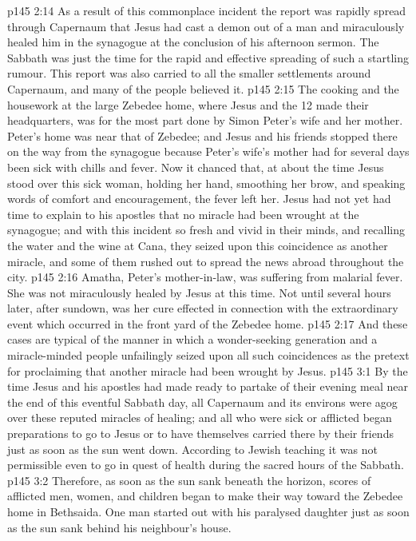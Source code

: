 \vs p145 2:14 As a result of this commonplace incident the report was rapidly spread through Capernaum that Jesus had cast a demon out of a man and miraculously healed him in the synagogue at the conclusion of his afternoon sermon. The Sabbath was just the time for the rapid and effective spreading of such a startling rumour. This report was also carried to all the smaller settlements around Capernaum, and many of the people believed it.
\vs p145 2:15 \pc The cooking and the housework at the large Zebedee home, where Jesus and the 12 made their headquarters, was for the most part done by Simon Peter’s wife and her mother. Peter’s home was near that of Zebedee; and Jesus and his friends stopped there on the way from the synagogue because Peter’s wife’s mother had for several days been sick with chills and fever. Now it chanced that, at about the time Jesus stood over this sick woman, holding her hand, smoothing her brow, and speaking words of comfort and encouragement, the fever left her. Jesus had not yet had time to explain to his apostles that no miracle had been wrought at the synagogue; and with this incident so fresh and vivid in their minds, and recalling the water and the wine at Cana, they seized upon this coincidence as another miracle, and some of them rushed out to spread the news abroad throughout the city.
\vs p145 2:16 Amatha, Peter’s mother\hyp{}in\hyp{}law, was suffering from malarial fever. She was not miraculously healed by Jesus at this time. Not until several hours later, after sundown, was her cure effected in connection with the extraordinary event which occurred in the front yard of the Zebedee home.
\vs p145 2:17 \pc And these cases are typical of the manner in which a wonder\hyp{}seeking generation and a miracle\hyp{}minded people unfailingly seized upon all such coincidences as the pretext for proclaiming that another miracle had been wrought by Jesus.
\vs p145 3:1 By the time Jesus and his apostles had made ready to partake of their evening meal near the end of this eventful Sabbath day, all Capernaum and its environs were agog over these reputed miracles of healing; and all who were sick or afflicted began preparations to go to Jesus or to have themselves carried there by their friends just as soon as the sun went down. According to Jewish teaching it was not permissible even to go in quest of health during the sacred hours of the Sabbath.
\vs p145 3:2 Therefore, as soon as the sun sank beneath the horizon, scores of afflicted men, women, and children began to make their way toward the Zebedee home in Bethsaida. One man started out with his paralysed daughter just as soon as the sun sank behind his neighbour’s house.
